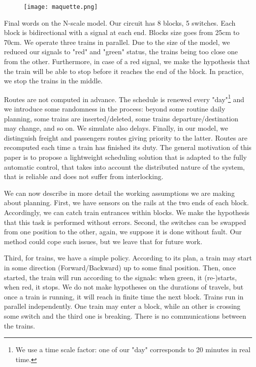 \documentclass[runningheads]{llncs}
\begin{document}
\begin{figure}
 \begin{minipage}{0.28\textwidth}
        \centering
        \vspace{-8mm}
\texttt{[image: maquette.png]}
    \end{minipage}
\end{figure}

Final words on the N-scale model. Our circuit has 8 blocks, 5 switches. Each block is bidirectional with a signal at each end. Blocks size goes from 25cm to 70cm.  We operate  three trains in parallel. Due to the size of the model, we reduced our signals  to "red" and "green" status, the trains being too close one from the other. Furthermore, in case of a red signal, we make the hypothesis that the train will be able to stop before it reaches the end of the block. In practice, we stop the trains in the middle. 


Routes are not computed in advance. The schedule is renewed every "day"\footnote{We use a time scale factor: one of our "day" corresponds to 20 minutes in real time.}  and we introduce some randomness in the process: beyond some routine daily planning, some trains are inserted/deleted, some trains departure/destination may change, and so on. We simulate also delays. Finally, in our model, we distinguish freight and  passengers routes giving priority to the latter. Routes are recomputed each time a train has finished its duty. The general motivation of this paper is to propose a lightweight scheduling solution that is adapted to the fully automatic control, that takes into account the distributed nature of the system, that is reliable and does not suffer from interlocking.  
 
We can now describe in more detail the working assumptions we are making about planning.  First, we have sensors on the rails at the two ends of each block. Accordingly,  we can catch train entrances within blocks. We make the hypothesis that this task is performed without errors. Second, the switches can be swapped from one position to the other, again, we suppose it is done without fault. Our method could cope such issues, but we leave that for future work. 
 
  Third, for trains, we have a simple policy.  According to its plan, a train may start in some direction (Forward/Backward) up to some final position. Then, once started, the train will run according to the signals: when green, it (re-)starts, when red, it stops.  We do not make hypotheses on the durations of travels, but once a train is running, it will reach in finite time the next block. Trains run in parallel independently. One train may enter a block, while an other is crossing some switch and the third one is breaking. There is no communications between the trains.
\end{document}
